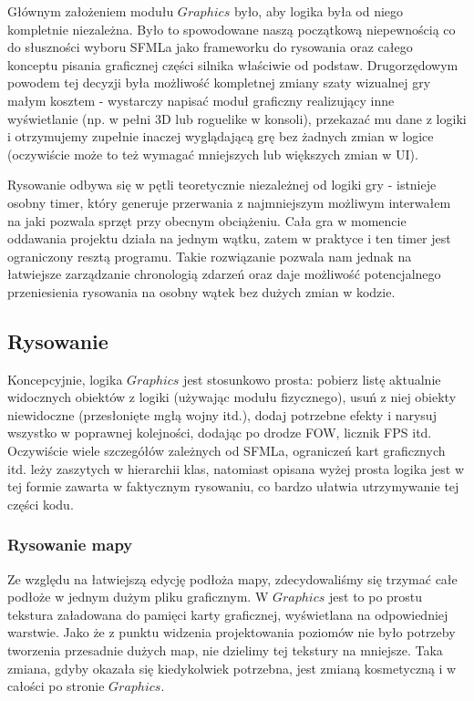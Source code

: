 \documentclass[licencjacka]{pracamgr}
\begin{document}
      Głównym założeniem modułu $Graphics$ było, aby logika była od niego kompletnie niezależna. Było to spowodowane
      naszą początkową niepewnością co do słuszności wyboru SFMLa jako frameworku do rysowania oraz całego konceptu
      pisania graficznej części silnika właściwie od podstaw. Drugorzędowym powodem tej decyzji była możliwość
      kompletnej zmiany szaty wizualnej gry małym kosztem - wystarczy napisać moduł graficzny realizujący inne
      wyświetlanie (np. w pełni 3D lub roguelike w konsoli), przekazać mu dane z logiki i otrzymujemy zupełnie inaczej
      wyglądającą grę bez żadnych zmian w logice (oczywiście może to też wymagać mniejszych lub większych zmian w UI).

      Rysowanie odbywa się w pętli teoretycznie niezależnej od logiki gry - istnieje osobny timer, który generuje
      przerwania z najmniejszym możliwym interwałem na jaki pozwala sprzęt przy obecnym obciążeniu. Cała gra w momencie
      oddawania projektu działa na jednym wątku, zatem w praktyce i ten timer jest ograniczony resztą programu. Takie
      rozwiązanie pozwala nam jednak na łatwiejsze zarządzanie chronologią zdarzeń oraz daje możliwość potencjalnego
      przeniesienia rysowania na osobny wątek bez dużych zmian w kodzie.

    \subsection{Rysowanie}
      Koncepcyjnie, logika $Graphics$ jest stosunkowo prosta: pobierz listę aktualnie widocznych obiektów z logiki
      (używając modułu fizycznego), usuń z niej obiekty niewidoczne (przesłonięte mgłą wojny itd.), dodaj potrzebne
      efekty i narysuj wszystko w poprawnej kolejności, dodając po drodze FOW, licznik FPS itd. Oczywiście wiele
      szczegółów zależnych od SFMLa, ograniczeń kart graficznych itd. leży zaszytych w hierarchii klas, natomiast
      opisana wyżej prosta logika jest w tej formie zawarta w faktycznym rysowaniu, co bardzo ułatwia utrzymywanie tej
      części kodu.

    \subsubsection{Rysowanie mapy}
      Ze względu na łatwiejszą edycję podłoża mapy, zdecydowaliśmy się trzymać całe podłoże w jednym dużym pliku
      graficznym. W $Graphics$ jest to po prostu tekstura załadowana do pamięci karty graficznej, wyświetlana na
      odpowiedniej warstwie. Jako że z punktu widzenia projektowania poziomów nie było potrzeby tworzenia przesadnie
      dużych map, nie dzielimy tej tekstury na mniejsze. Taka zmiana, gdyby okazała się kiedykolwiek potrzebna,
      jest zmianą kosmetyczną i w całości po stronie $Graphics$.
\end{document}
